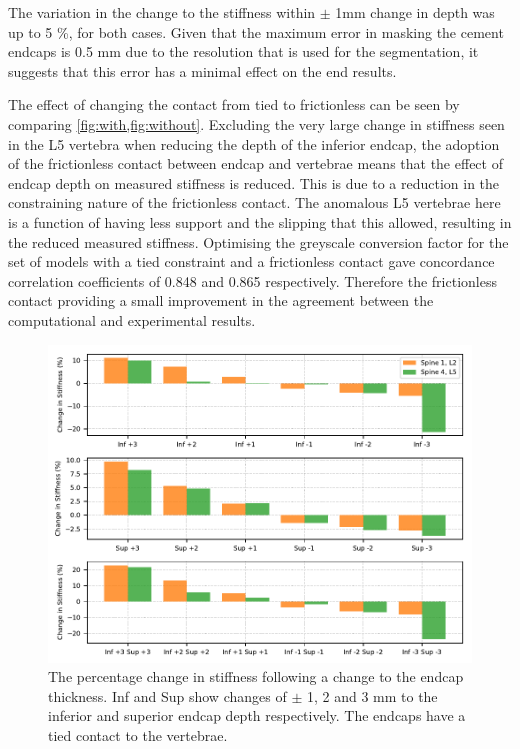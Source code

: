 The variation in the change to the stiffness within $\pm$ 1mm change in depth was up to 5 \%, for both cases.
Given that the maximum error in masking the cement endcaps is 0.5 mm due to the resolution that is used for the segmentation, it suggests that this error has a minimal effect on the end results.

The effect of changing the contact from tied to frictionless can be seen by comparing \cref{fig:with,fig:without}.
Excluding the very large change in stiffness seen in the L5 vertebra when reducing the depth of the inferior endcap, the adoption of the frictionless contact between endcap and vertebrae means that the effect of endcap depth on measured stiffness is reduced.
This is due to a reduction in the constraining nature of the frictionless contact.
The anomalous L5 vertebrae here is a function of having less support and the slipping that this allowed, resulting in the reduced measured stiffness.
Optimising the greyscale conversion factor for the set of models with a tied constraint and a frictionless contact gave concordance correlation coefficients of 0.848 and 0.865 respectively.
Therefore the frictionless contact providing a small improvement in the agreement between the computational and experimental results.





\begin{figure}[h!]
\centering
\includegraphics[width=\textwidth]{Chapters/Chapter_HT_images/with.pdf}
\caption{The percentage change in stiffness following a change to the endcap thickness. Inf and Sup show changes of $\pm$ 1, 2 and 3 mm to the inferior and superior endcap depth respectively. The endcaps have a tied contact to the vertebrae.}
\label{fig:with}
\end{figure}

